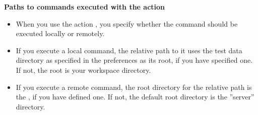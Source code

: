 \textbf{Paths to commands executed with the  action}\\
\begin{itemize}
\item When you use the action , you specify whether the command should be executed locally or remotely. 
\item If you execute a local command, the relative path to it uses the test data directory as specified in the preferences as its root, if you have specified one. If not, the root is your workspace directory. 
\item If you execute a remote command, the root directory for the relative path is the \gdaut{} , if you have defined one. If not, the default root directory is the ''server'' directory. 
\end{itemize}

